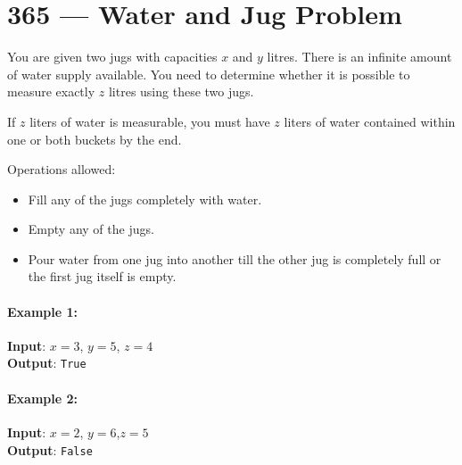 \section{365 --- Water and Jug Problem}
You are given two jugs with capacities $ x $ and $ y $ litres. There is an infinite amount of water supply available. You need to determine whether it is possible to measure exactly $ z $ litres using these two jugs.
\par
If $ z $ liters of water is measurable, you must have $ z $ liters of water contained within one or both buckets by the end.
\par

Operations allowed:

\begin{itemize}
\item Fill any of the jugs completely with water.
\item Empty any of the jugs.
\item Pour water from one jug into another till the other jug is  completely full or the first jug itself is empty.
\end{itemize}

\paragraph{Example 1: }

\begin{flushleft}
\textbf{Input}: $ x = 3 $, $ y = 5 $, $ z = 4 $
\\
\textbf{Output}: \texttt{True}
\end{flushleft}

\paragraph{Example 2:}

\begin{flushleft}
\textbf{Input}: $ x = 2 $, $  y = 6 $,$  z = 5 $
\\
\textbf{Output}: \texttt{False}
\end{flushleft}

